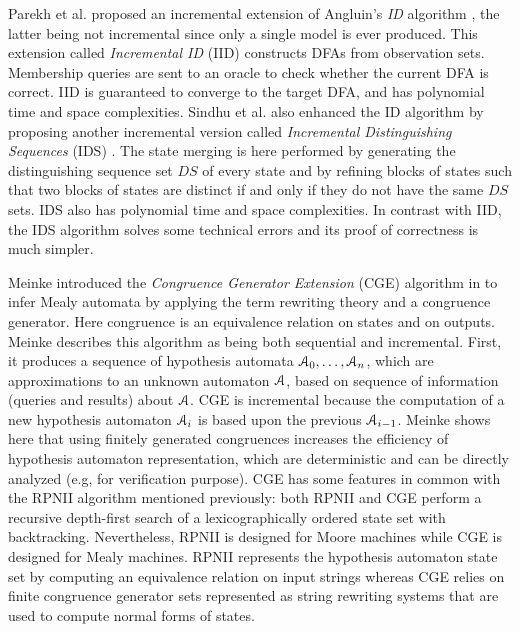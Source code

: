 Parekh et al. \cite{parekh98} proposed an incremental extension
of Angluin's \textit{ID} algorithm \cite{ANGLUIN198176}, the
latter being not incremental since only a single model is
ever produced. This extension called \textit{Incremental ID}
(IID) constructs DFAs from observation sets. Membership queries
are sent to an oracle to check whether the current DFA is
correct. IID is guaranteed to converge to the target DFA, and has
polynomial time and space complexities. Sindhu et al. also
enhanced the ID algorithm by proposing another incremental
version called \textit{Incremental Distinguishing Sequences}
(IDS) \cite{journals/corr/abs-1206-2691}. The state merging is
here performed by generating the distinguishing sequence set $DS$
of every state and by refining blocks of states such that two
blocks of states are distinct if and only if they do not have the
same $DS$ sets. IDS also has polynomial time and space
complexities. In contrast with IID, the IDS algorithm solves some
technical errors and its proof of correctness is much simpler.

Meinke introduced the \textit{Congruence Generator Extension}
(CGE) algorithm in \cite{meinkeCGE} to infer Mealy automata by
applying the term rewriting theory and a congruence generator.
Here congruence is an equivalence relation on states and on
outputs. Meinke describes this algorithm as being both sequential
and incremental. First, it produces a sequence of hypothesis
automata $\EuScript{A}_0, \dots, \EuScript{A}_n$, which are
approximations to an unknown automaton $\EuScript{A}$, based on
sequence of information (queries and results) about
$\EuScript{A}$. CGE is incremental because the computation
of a new hypothesis automaton $\EuScript{A}_i$ is based upon the
previous $\EuScript{A}_{i-1}$. Meinke shows here that using
finitely generated congruences increases the efficiency of
hypothesis automaton representation, which are deterministic
and can be directly analyzed (e.g, for verification purpose). CGE
has some features in common with the RPNII algorithm mentioned
previously: both RPNII and CGE perform a recursive depth-first
search of a lexicographically ordered state set with
backtracking. Nevertheless, RPNII is designed for Moore machines
while CGE is designed for Mealy machines. RPNII represents the
hypothesis automaton state set by computing an equivalence
relation on input strings whereas CGE relies on finite congruence
generator sets represented as string rewriting systems that are
used to compute normal forms of states.

